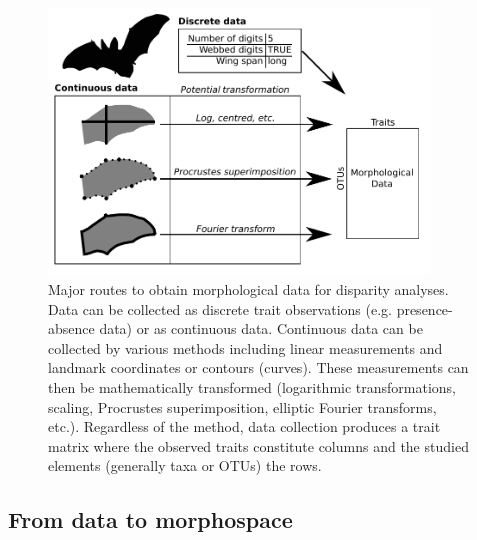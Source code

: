 \documentclass[12pt,letterpaper]{article}
\begin{document}
\begin{figure}[!htbp]
\centering
   \includegraphics[width=0.9\textwidth]{Figures/figure_data.pdf}
\caption{
    Major routes to obtain morphological data for disparity analyses. Data can be collected as discrete trait observations (e.g. presence-absence data) or as continuous data.
    Continuous data can be collected by various methods including linear measurements and landmark coordinates or contours (curves).
    These measurements can then be mathematically transformed (logarithmic transformations, scaling, Procrustes superimposition, elliptic Fourier transforms, etc.).
    Regardless of the method, data collection produces a trait matrix where the observed traits constitute columns and the studied elements (generally taxa or OTUs) the rows.
}
\label{Fig:data}
\end{figure}


\subsection{From data to morphospace} \label{section:morphospace}

\end{document}
